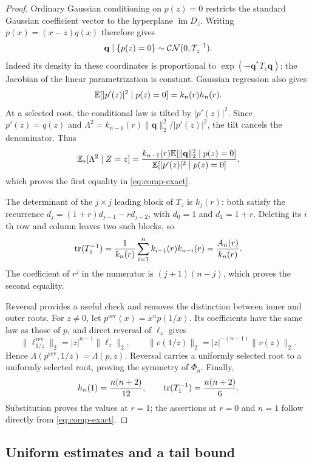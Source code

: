 \begin{proof}
Ordinary Gaussian conditioning on $p(z)=0$ restricts the standard
Gaussian coefficient vector to the hyperplane $\operatorname{im}D_z$.
Writing $p(x)=(x-z)q(x)$ therefore gives
\[
  \mathbf q\mid\{p(z)=0\}\sim\mathcal{CN}(0,T_z^{-1}).
\]
Indeed its density in these coordinates is proportional to
$\exp(-\mathbf q^*T_z\mathbf q)$; the Jacobian of the linear
parametrization is constant.  Gaussian regression also gives
\[
  \mathbb E[|p'(z)|^2\mid p(z)=0]=k_n(r)h_n(r).
\]
At a selected root, the conditional law is tilted by $|p'(z)|^2$.
Since $p'(z)=q(z)$ and
$\Lambda^2=k_{n-1}(r)\|\mathbf q\|_2^2/|p'(z)|^2$, the tilt cancels
the denominator.  Thus
\[
  \mathbb E_*[\Lambda^2\mid Z=z]
  =\frac{k_{n-1}(r)\mathbb E[\|\mathbf q\|_2^2\mid p(z)=0]}
  {\mathbb E[|p'(z)|^2\mid p(z)=0]},
\]
which proves the first equality in \eqref{eq:comp-exact}.

The determinant of the $j\times j$ leading block of $T_z$ is $k_j(r)$:
both satisfy the recurrence
$d_j=(1+r)d_{j-1}-r d_{j-2}$, with $d_0=1$ and $d_1=1+r$.
Deleting its $i$th row and column leaves two such blocks, so
\begin{equation}\label{eq:comp-trace-minors}
  \operatorname{tr}(T_z^{-1})
  =\frac1{k_n(r)}\sum_{i=1}^{n}k_{i-1}(r)k_{n-i}(r)
  =\frac{A_n(r)}{k_n(r)}.
\end{equation}
The coefficient of $r^j$ in the numerator is $(j+1)(n-j)$,
which proves the second equality.

Reversal provides a useful check and removes the distinction between
inner and outer roots.  For $z\ne0$, let $p^{\mathrm{rev}}(x)=x^np(1/x)$.
Its coefficients have the same law as those of $p$, and direct reversal
of $\ell_z$ gives
\[
  \|\ell^{\mathrm{rev}}_{1/z}\|_2
   =|z|^{n-1}\|\ell_z\|_2,
  \qquad
  \|v(1/z)\|_2=|z|^{-(n-1)}\|v(z)\|_2.
\]
Hence $\Lambda(p^{\mathrm{rev}},1/z)=\Lambda(p,z)$.  Reversal carries a
uniformly selected root to a uniformly selected root, proving the
symmetry of $\Phi_n$.  Finally,
\[
  h_n(1)=\frac{n(n+2)}{12},
  \qquad \operatorname{tr}(T_1^{-1})=\frac{n(n+2)}6.
\]
Substitution proves the values at $r=1$; the assertions at $r=0$ and
$n=1$ follow directly from \eqref{eq:comp-exact}.
\end{proof}

\subsection{Uniform estimates and a tail bound}

